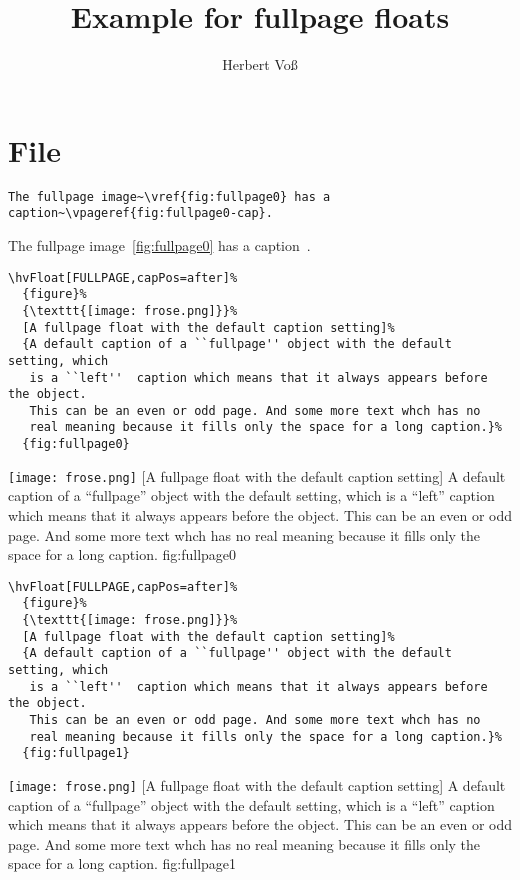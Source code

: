 \documentclass{scrartcl}
\begin{document}
\title{Example for fullpage floats}
\author{Herbert Voß}
\maketitle

\tableofcontents
\Blindtext

\blindtext

\section{File \texttt{\jobname}}

\begin{lstlisting}
The fullpage image~\vref{fig:fullpage0} has a caption~\vpageref{fig:fullpage0-cap}.
\end{lstlisting}

The fullpage image~\vref{fig:fullpage0} has a caption~.

\begin{lstlisting}
\hvFloat[FULLPAGE,capPos=after]%
  {figure}%
  {\texttt{[image: frose.png]}}%
  [A fullpage float with the default caption setting]%
  {A default caption of a ``fullpage'' object with the default setting, which
   is a ``left''  caption which means that it always appears before the object.
   This can be an even or odd page. And some more text whch has no
   real meaning because it fills only the space for a long caption.}%
  {fig:fullpage0}
\end{lstlisting}


\Float[default]
%
  {\texttt{[image: frose.png]}}%
  [A fullpage float with the default caption setting]%
  {A default caption of a ``fullpage'' object with the default setting, which
   is a ``left''  caption which means that it always appears before the object.
   This can be an even or odd page. And some more text whch has no
   real meaning because it fills only the space for a long caption.}%
  {fig:fullpage0}

\Blindtext


\begin{lstlisting}
\hvFloat[FULLPAGE,capPos=after]%
  {figure}%
  {\texttt{[image: frose.png]}}%
  [A fullpage float with the default caption setting]%
  {A default caption of a ``fullpage'' object with the default setting, which
   is a ``left''  caption which means that it always appears before the object.
   This can be an even or odd page. And some more text whch has no
   real meaning because it fills only the space for a long caption.}%
  {fig:fullpage1}
\end{lstlisting}


\Float[default]
%
  {\texttt{[image: frose.png]}}%
  [A fullpage float with the default caption setting]%
  {A default caption of a ``fullpage'' object with the default setting, which
   is a ``left''  caption which means that it always appears before the object.
   This can be an even or odd page. And some more text whch has no
   real meaning because it fills only the space for a long caption.}%
  {fig:fullpage1}

\blinddocument


\Blindtext
\end{document}
